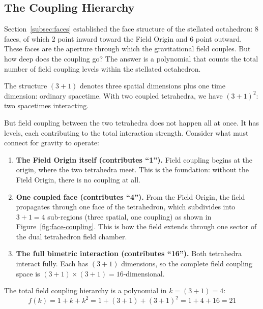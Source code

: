 \documentclass[aps,prd,preprint,superscriptaddress,showpacs,preprintnumbers,amsmath,amssymb,nofootinbib]{revtex4-2}
\begin{document}
\subsection{The Coupling Hierarchy}
\label{subsec:hierarchy}

Section~\ref{subsec:faces} established the face structure of the stellated octahedron: 8 faces, of which 2 point inward toward the Field Origin and 6 point outward. These faces are the aperture through which the gravitational field couples. But how deep does the coupling go? The answer is a polynomial that counts the total number of field coupling levels within the stellated octahedron.

The structure $(3+1)$ denotes three spatial dimensions plus one time dimension: ordinary spacetime. With two coupled tetrahedra, we have $(3+1)^2$: two spacetimes interacting.

But field coupling between the two tetrahedra does not happen all at once. It has levels, each contributing to the total interaction strength. Consider what must connect for gravity to operate:

\begin{enumerate}
\item \textbf{The Field Origin itself (contributes ``1'').} Field coupling begins at the origin, where the two tetrahedra meet. This is the foundation: without the Field Origin, there is no coupling at all.
\item \textbf{One coupled face (contributes ``4'').} From the Field Origin, the field propagates through one face of the tetrahedron, which subdivides into $3 + 1 = 4$ sub-regions (three spatial, one coupling) as shown in Figure~\ref{fig:face-coupling}. This is how the field extends through one sector of the dual tetrahedron field chamber.
\item \textbf{The full bimetric interaction (contributes ``16'').} Both tetrahedra interact fully. Each has $(3+1)$ dimensions, so the complete field coupling space is $(3+1) \times (3+1) = 16$-dimensional.
\end{enumerate}

The total field coupling hierarchy is a polynomial in $k = (3+1) = 4$:
\begin{equation}
f(k) = 1 + k + k^2 = 1 + (3+1) + (3+1)^2 = 1 + 4 + 16 = 21
\label{eq:polynomial}
\end{equation}
\end{document}
